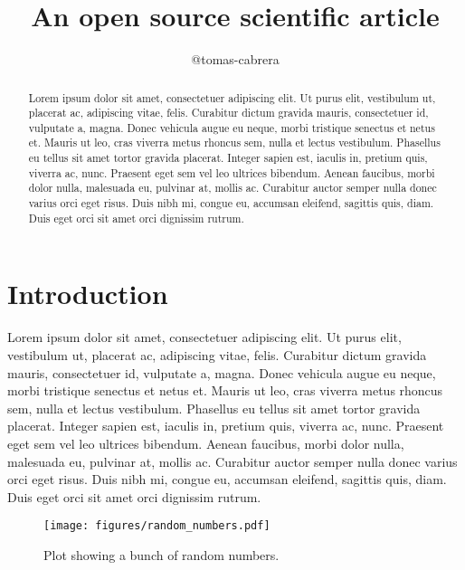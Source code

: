 \documentclass[twocolumn]{aastex631}
\begin{document}
\title{An open source scientific article}

\author{@tomas-cabrera}

\begin{abstract}
    Lorem ipsum dolor sit amet, consectetuer adipiscing elit.
    Ut purus elit, vestibulum ut, placerat ac, adipiscing vitae, felis.
    Curabitur dictum gravida mauris, consectetuer id, vulputate a, magna.
    Donec vehicula augue eu neque, morbi tristique senectus et netus et.
    Mauris ut leo, cras viverra metus rhoncus sem, nulla et lectus vestibulum.
    Phasellus eu tellus sit amet tortor gravida placerat.
    Integer sapien est, iaculis in, pretium quis, viverra ac, nunc.
    Praesent eget sem vel leo ultrices bibendum.
    Aenean faucibus, morbi dolor nulla, malesuada eu, pulvinar at, mollis ac.
    Curabitur auctor semper nulla donec varius orci eget risus.
    Duis nibh mi, congue eu, accumsan eleifend, sagittis quis, diam.
    Duis eget orci sit amet orci dignissim rutrum.
\end{abstract}

\section{Introduction}
\label{sec:intro}

Lorem ipsum dolor sit amet, consectetuer adipiscing elit.
Ut purus elit, vestibulum ut, placerat ac, adipiscing vitae, felis.
Curabitur dictum gravida mauris, consectetuer id, vulputate a, magna.
Donec vehicula augue eu neque, morbi tristique senectus et netus et.
Mauris ut leo, cras viverra metus rhoncus sem, nulla et lectus vestibulum.
Phasellus eu tellus sit amet tortor gravida placerat.
Integer sapien est, iaculis in, pretium quis, viverra ac, nunc.
Praesent eget sem vel leo ultrices bibendum.
Aenean faucibus, morbi dolor nulla, malesuada eu, pulvinar at, mollis ac.
Curabitur auctor semper nulla donec varius orci eget risus.
Duis nibh mi, congue eu, accumsan eleifend, sagittis quis, diam.
Duis eget orci sit amet orci dignissim rutrum.

\begin{figure}[ht!]
    \begin{centering}
        \texttt{[image: figures/random\_numbers.pdf]}
        \caption{
            Plot showing a bunch of random numbers.
        }
        \label{fig:random_numbers}
    \end{centering}
\end{figure}
\end{document}
